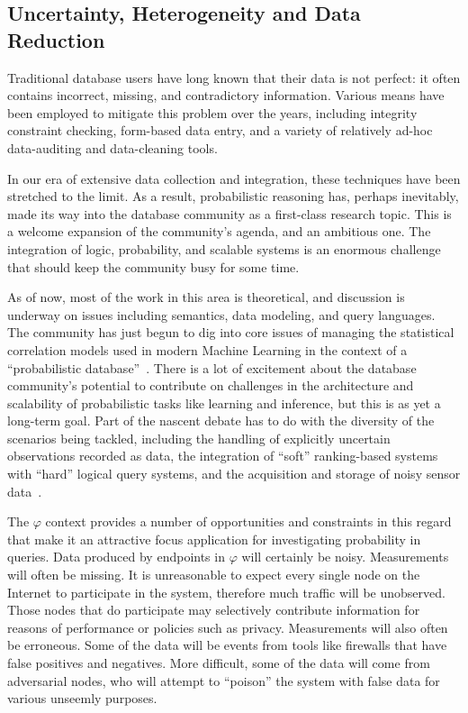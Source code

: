 \documentclass{acm_proc_article-sp}
\def\philogo{{\large $\varphi$}\xspace}
\begin{document}
\subsection{Uncertainty, Heterogeneity and Data Reduction}

Traditional database users have long known that their data is not perfect: it often contains incorrect, missing, and contradictory information. Various means have been employed to mitigate this problem over the years, including integrity constraint checking, form-based data entry, and a variety of relatively ad-hoc data-auditing and data-cleaning tools.

In our era of extensive data collection and integration, these techniques have been stretched to the limit. As a result, probabilistic reasoning has, perhaps inevitably, made its way into the database community as a first-class research topic. This is a welcome expansion of the community's agenda, and an ambitious one. The integration of logic, probability, and scalable systems is an enormous challenge that should keep the community busy for some time.

As of now, most of the work in this area is theoretical, and discussion is underway on issues including semantics, data modeling, and query languages. The community has just begun to dig into core issues of managing the statistical correlation models used in modern Machine Learning in the context of a ``probabilistic database''~\cite{mauvedb}. There is a lot of excitement about the database community's potential to contribute on challenges in the architecture and scalability of probabilistic tasks like learning and inference, but this is as yet a long-term goal. Part of the nascent debate has to do with the diversity of the scenarios being tackled, including the handling of explicitly uncertain observations recorded as data, the integration of ``soft'' ranking-based systems with ``hard'' logical query systems, and the acquisition and storage of noisy sensor data~\cite{debull06}.

The \philogo context provides a number of opportunities and constraints in this regard that make it an attractive focus application for investigating probability in queries. Data produced by endpoints in \philogo will certainly be noisy. Measurements will often be missing. It is unreasonable to expect every single node on the Internet to participate in the system, therefore much traffic will be unobserved. Those nodes that do participate may selectively contribute information for reasons of performance or policies such as privacy. Measurements will also often be erroneous. Some of the data will be events from tools like firewalls that have false positives and negatives. More difficult, some of the data will come from adversarial nodes, who will attempt to ``poison'' the system with false data for various unseemly purposes.
\end{document}
